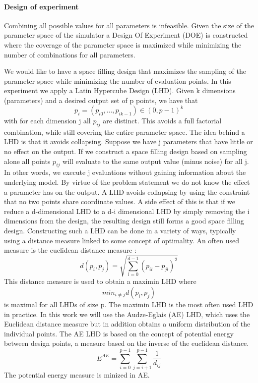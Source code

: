\paragraph{Design of experiment}
Combining all possible values for all parameters is infeasible. 
Given the size of the parameter space of the simulator a Design Of Experiment (DOE) is constructed where the coverage of the parameter space is maximized while minimizing the number of combinations for all parameters. 

We would like to have a space filling design that maximizes the sampling of the parameter space while minimizing the number of evaluation points.
In this experiment we apply a Latin Hypercube Design (LHD). 
Given k dimensions (parameters) and a desired output set of p points, we have that 
\[
p_i = (p_{i0}, ..., p_{i k-1}) \in (0, p -1)^k
\]
with for each dimension j all $p_{ij}$ are distinct. This avoids a full factorial combination, while still covering the entire parameter space. 
The idea behind a LHD is that it avoids collapsing. Suppose we have j parameters that have little or no effect on the output. If we construct a space filling design based on sampling alone all points $p_{ij}$ will evaluate to the same output value (minus noise) for all j. In other words, we execute j evaluations without gaining information about the underlying model. By virtue of the problem statement we do not know the effect a parameter has on the output. A LHD avoids collapsing by using the constraint that no two points share coordinate values. A side effect of this is that if we reduce a d-dimensional LHD to a d-i dimensional LHD by simply removing the i dimensions from the design, the resulting design still forms a good space filling design.
Constructing such a LHD can be done in a variety of ways, typically using a distance measure linked to some concept of optimality. An often used measure is the euclidean distance measure :
\[
d(p_i, p_j) = \sqrt{\sum_{l=0}^{d-1}(p_{il}-p_{jl})^2}
\]
This distance measure is used to obtain a maximin LHD where
\[
min_{i \neq j} d(p_i,p_j)
\]
is maximal for all LHDs of size p. The maximin LHD is the most often used LHD in practice. In this work we will use the Audze-Eglais \citep{AudzeEglais, AudzeEglais2, AudzeEglais3} (AE) LHD, which uses the Euclidean distance measure but in addition obtains a uniform distribution of the individual points. 
The AE LHD is based on the concept of potential energy between design points, a measure based on the inverse of the euclidean distance.
\[
E^{AE} = \sum_{i=0}^{p-1} {\sum_{j=i+1}^{p-1} {\frac{1}{d_{ij}}}}
\]
The potential energy measure is minized in AE.
